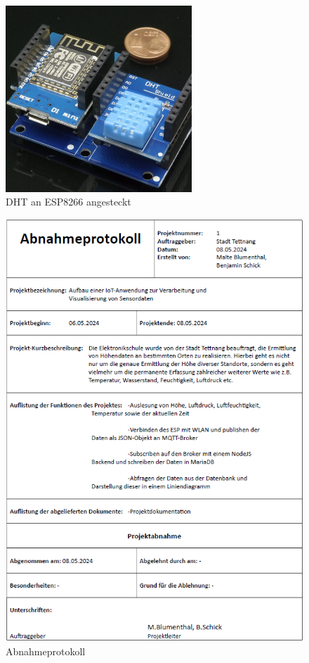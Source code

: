\begin{figure}[h]
	\centering
	\includegraphics[width=7cm]{images/esp_dht.png}
	\caption[dht\_an\_esp]{DHT an ESP8266 angesteckt}
	\label{fig:dht_an_esp}
\end{figure}

\begin{figure}[h]
	\centering
	\includegraphics[width=14.5cm]{images/Abnahmeprotokoll.png}
	\caption{Abnahmeprotokoll}
	\label{fig:abnahmeprotokoll}
\end{figure}

